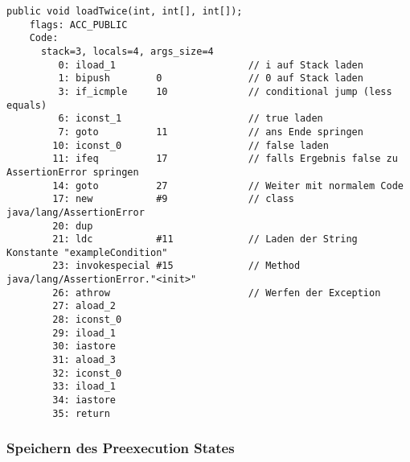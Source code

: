 \begin{lstlisting}[caption=Bytecode der loadTwice Prozedur mit precondition,label={lst:loadtwice_code_precond}]
public void loadTwice(int, int[], int[]);
    flags: ACC_PUBLIC
    Code:
      stack=3, locals=4, args_size=4
         0: iload_1                       // i auf Stack laden
         1: bipush        0               // 0 auf Stack laden
         3: if_icmple     10              // conditional jump (less equals)
         6: iconst_1                      // true laden
         7: goto          11              // ans Ende springen
        10: iconst_0                      // false laden
        11: ifeq          17              // falls Ergebnis false zu AssertionError springen
        14: goto          27              // Weiter mit normalem Code
        17: new           #9              // class java/lang/AssertionError
        20: dup         
        21: ldc           #11             // Laden der String Konstante "exampleCondition"
        23: invokespecial #15             // Method java/lang/AssertionError."<init>"
        26: athrow                        // Werfen der Exception
        27: aload_2       
        28: iconst_0      
        29: iload_1       
        30: iastore       
        31: aload_3       
        32: iconst_0      
        33: iload_1       
        34: iastore       
        35: return  
\end{lstlisting}

\subsubsection{Speichern des Preexecution States}

